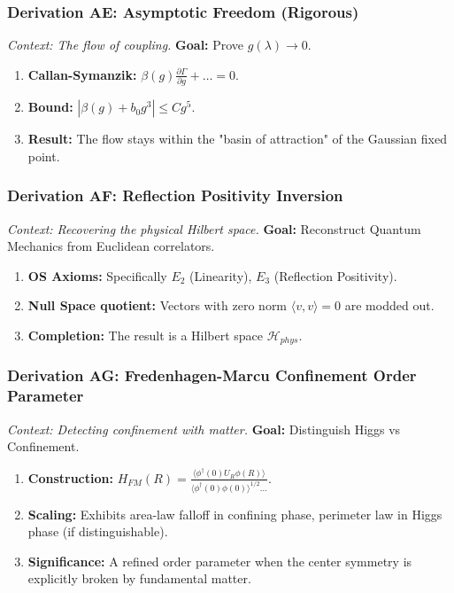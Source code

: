 \subsubsection{Derivation AE: Asymptotic Freedom (Rigorous)}
\textit{Context: The flow of coupling.}
\textbf{Goal:} Prove $g(\lambda) \to 0$.
\begin{enumerate}
    \item \textbf{Callan-Symanzik:} $\beta(g) \frac{\partial \Gamma}{\partial g} + \dots = 0$.
    \item \textbf{Bound:} $|\beta(g) + b_0 g^3| \le C g^5$.
    \item \textbf{Result:} The flow stays within the "basin of attraction" of the Gaussian fixed point.
\end{enumerate}

\subsubsection{Derivation AF: Reflection Positivity Inversion}
\textit{Context: Recovering the physical Hilbert space.}
\textbf{Goal:} Reconstruct Quantum Mechanics from Euclidean correlators.
\begin{enumerate}
    \item \textbf{OS Axioms:} Specifically $E_2$ (Linearity), $E_3$ (Reflection Positivity).
    \item \textbf{Null Space quotient:} Vectors with zero norm $\langle v,v \rangle=0$ are modded out.
    \item \textbf{Completion:} The result is a Hilbert space $\mathcal{H}_{phys}$.
\end{enumerate}

\subsubsection{Derivation AG: Fredenhagen-Marcu Confinement Order Parameter}
\textit{Context: Detecting confinement with matter.}
\textbf{Goal:} Distinguish Higgs vs Confinement.
\begin{enumerate}
    \item \textbf{Construction:} $H_{FM}(R) = \frac{\langle \phi^\dagger(0) U_R \phi(R) \rangle}{\langle \phi^\dagger(0) \phi(0) \rangle^{1/2} \dots}$.
    \item \textbf{Scaling:} Exhibits area-law falloff in confining phase, perimeter law in Higgs phase (if distinguishable).
    \item \textbf{Significance:} A refined order parameter when the center symmetry is explicitly broken by fundamental matter.
\end{enumerate}

